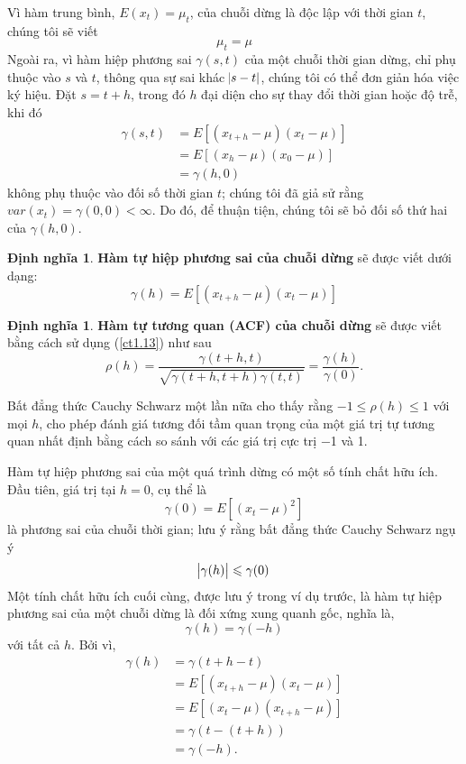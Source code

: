 \documentclass[12pt, a4paper,oneside]{book}
\theoremstyle{definition}
\newtheorem{dn}[theo]{Định nghĩa}
\begin{document}
Vì hàm trung bình, $E(x_{t})=\mu_{t}$, của chuỗi dừng là độc lập với thời gian $t$, chúng tôi sẽ viết
\begin{equation}
	\mu_{t}=\mu \label{ct1.23}
\end{equation}
Ngoài ra, vì hàm hiệp phương sai  $ \gamma(s, t)$ của một chuỗi thời gian dừng, chỉ phụ thuộc vào $s$ và $t$, thông qua sự sai khác $ \abs{s-t} $, chúng tôi có thể đơn giản hóa việc ký hiệu. Đặt $s = t + h$, trong đó $h$ đại diện cho sự thay đổi thời gian hoặc độ trễ, khi đó
\begin{align*}
\gamma(s, t)&= E[(x_{t+h}-\mu)(x_{t}-\mu)]\\
&=E[(x_{h}-\mu)(x_{0}-\mu)]\\
&=\gamma(h,0)
\end{align*}
không phụ thuộc vào đối số thời gian $t$; chúng tôi đã giả sử rằng $var(x_{t}) =\gamma(0,0) < \infty $. Do đó, để thuận tiện, chúng tôi sẽ bỏ đối số thứ hai của $\gamma(h,0)$.

\begin{dn}\textbf{Hàm tự hiệp phương sai của chuỗi dừng} sẽ được viết dưới dạng: 
	\begin{equation}
	\gamma(h)= E[(x_{t+h}-\mu)(x_{t}-\mu)] \label{ct1.24}
	\end{equation}	
\end{dn}
\begin{dn} \textbf{Hàm tự tương quan (ACF) của chuỗi dừng} sẽ được viết bằng cách sử dụng (\ref{ct1.13}) như sau
	\begin{equation}
		\rho(h)=\frac{\gamma(t+h,t)}{\sqrt{\gamma(t+h,t+h)\gamma(t,t)}}=\dfrac{\gamma(h)}{\gamma(0)}. \label{ct1.25}
	\end{equation}
\end{dn}

Bất đẳng thức Cauchy Schwarz một lần nữa cho thấy rằng $−1\leqslant \rho(h) \leqslant 1$ với mọi $h$, cho phép đánh giá tương đối tầm quan trọng của một giá trị tự tương quan nhất định bằng cách so sánh với các giá trị cực trị −1 và 1.

Hàm tự hiệp phương sai của một quá trình dừng có một số tính chất hữu ích. Đầu tiên, giá trị tại $h = 0$, cụ thể là
\begin{equation}
	\gamma(0)=E[(x_{t}-\mu)^{2}] \label{ct1.26}
\end{equation}
là phương sai của chuỗi thời gian; lưu ý rằng bất đẳng thức Cauchy Schwarz ngụ ý
\begin{equation}
	\abs{\gamma(h)}\leqslant \gamma(0) \label{ct1.27}
\end{equation}
Một tính chất hữu ích cuối cùng, được lưu ý trong ví dụ trước, là hàm tự hiệp phương sai của một chuỗi dừng là đối xứng xung quanh gốc, nghĩa là,
\begin{equation}
\gamma(h)=\gamma(-h) \label{ct1.28}
\end{equation}
với tất cả $h$. Bởi vì,
\begin{align*}
\gamma(h)&=\gamma(t+h-t) \\
&=E[(x_{t+h}-\mu)(x_{t}-\mu)]\\
&=E[(x_{t}-\mu)(x_{t+h}-\mu)]\\
&=\gamma(t-(t+h))\\
&=\gamma(-h). 
\end{align*}
\end{document}
